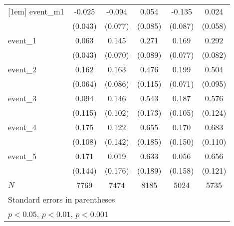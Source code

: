 {\begin{tabular}{l*{5}{c}}
[1em]
event\_m1    &      -0.025         &      -0.094         &       0.054         &      -0.135         &       0.024         \\
            &     (0.043)         &     (0.077)         &     (0.085)         &     (0.087)         &     (0.058)         \\
[1em]
event\_1     &       0.063         &       0.145\sym{*}  &       0.271\sym{**} &       0.169\sym{*}  &       0.292\sym{***}\\
            &     (0.043)         &     (0.070)         &     (0.089)         &     (0.077)         &     (0.082)         \\
[1em]
event\_2     &       0.162\sym{*}  &       0.163         &       0.476\sym{***}&       0.199\sym{**} &       0.504\sym{***}\\
            &     (0.064)         &     (0.086)         &     (0.115)         &     (0.071)         &     (0.095)         \\
[1em]
event\_3     &       0.094         &       0.146         &       0.543\sym{**} &       0.187         &       0.576\sym{***}\\
            &     (0.115)         &     (0.102)         &     (0.173)         &     (0.105)         &     (0.124)         \\
[1em]
event\_4     &       0.175         &       0.122         &       0.655\sym{***}&       0.170         &       0.683\sym{***}\\
            &     (0.108)         &     (0.142)         &     (0.185)         &     (0.150)         &     (0.110)         \\
[1em]
event\_5     &       0.171         &       0.019         &       0.633\sym{***}&       0.056         &       0.656\sym{***}\\
            &     (0.144)         &     (0.176)         &     (0.189)         &     (0.158)         &     (0.121)         \\
\hline
\(N\)       &        7769         &        7474         &        8185         &        5024         &        5735         \\
\hline\hline
\multicolumn{6}{l}{\footnotesize Standard errors in parentheses}\\
\multicolumn{6}{l}{\footnotesize \sym{*} \(p<0.05\), \sym{**} \(p<0.01\), \sym{***} \(p<0.001\)}\\
\end{tabular}
}
